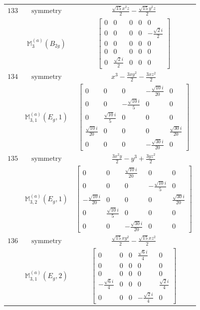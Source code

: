 \documentclass[fleqn,8pt,landscape]{jsarticle}
\begin{document}
\begin{longtable}{ccc}
$ 133 $ & $ \text{symmetry} $ & $ \frac{\sqrt{15} x^{2} z}{2} - \frac{\sqrt{15} y^{2} z}{2} $ \\
$  $ & $ \mathbb{M}_{3}^{(a)}(B_{2g}) $ & $ \begin{bmatrix} 0 & 0 & 0 & 0 & 0 \\ 0 & 0 & 0 & 0 & - \frac{\sqrt{2} i}{2} \\ 0 & 0 & 0 & 0 & 0 \\ 0 & 0 & 0 & 0 & 0 \\ 0 & \frac{\sqrt{2} i}{2} & 0 & 0 & 0 \end{bmatrix} $ \\ \hline
$ 134 $ & $ \text{symmetry} $ & $ x^{3} - \frac{3 x y^{2}}{2} - \frac{3 x z^{2}}{2} $ \\
$  $ & $ \mathbb{M}_{3,1}^{(a)}(E_{g},1) $ & $ \begin{bmatrix} 0 & 0 & 0 & - \frac{\sqrt{10} i}{20} & 0 \\ 0 & 0 & - \frac{\sqrt{10} i}{5} & 0 & 0 \\ 0 & \frac{\sqrt{10} i}{5} & 0 & 0 & 0 \\ \frac{\sqrt{10} i}{20} & 0 & 0 & 0 & \frac{\sqrt{30} i}{20} \\ 0 & 0 & 0 & - \frac{\sqrt{30} i}{20} & 0 \end{bmatrix} $ \\ \hline
$ 135 $ & $ \text{symmetry} $ & $ \frac{3 x^{2} y}{2} - y^{3} + \frac{3 y z^{2}}{2} $ \\
$  $ & $ \mathbb{M}_{3,2}^{(a)}(E_{g},1) $ & $ \begin{bmatrix} 0 & 0 & \frac{\sqrt{10} i}{20} & 0 & 0 \\ 0 & 0 & 0 & - \frac{\sqrt{10} i}{5} & 0 \\ - \frac{\sqrt{10} i}{20} & 0 & 0 & 0 & \frac{\sqrt{30} i}{20} \\ 0 & \frac{\sqrt{10} i}{5} & 0 & 0 & 0 \\ 0 & 0 & - \frac{\sqrt{30} i}{20} & 0 & 0 \end{bmatrix} $ \\ \hline
$ 136 $ & $ \text{symmetry} $ & $ \frac{\sqrt{15} x y^{2}}{2} - \frac{\sqrt{15} x z^{2}}{2} $ \\
$  $ & $ \mathbb{M}_{3,1}^{(a)}(E_{g},2) $ & $ \begin{bmatrix} 0 & 0 & 0 & \frac{\sqrt{6} i}{4} & 0 \\ 0 & 0 & 0 & 0 & 0 \\ 0 & 0 & 0 & 0 & 0 \\ - \frac{\sqrt{6} i}{4} & 0 & 0 & 0 & \frac{\sqrt{2} i}{4} \\ 0 & 0 & 0 & - \frac{\sqrt{2} i}{4} & 0 \end{bmatrix} $ \\ \hline

\end{longtable}
\end{document}
